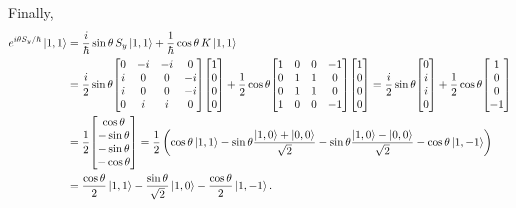 \begin{solution}
	Finally,
	\begin{align*}
		\eitsyh \kqq &= \frac{i}{\hbar} \sint \, \Sy \kqq + \frac{1}{\hbar} \cost \, K \kqq \\
		&= \frac{i}{2} \sint \mqty[ 0 & -i & -i & 0 \\ i & 0 & 0 & -i \\ i & 0 & 0 & -i \\ 0 & i & i & 0 ] \mqty[ 1 \\ 0 \\ 0 \\ 0 ] + \frac{1}{2} \cost \mqty[ 1 & 0 & 0 & -1 \\ 0 & 1 & 1 & 0 \\ 0 & 1 & 1 & 0 \\ 1 & 0 & 0 & -1 ] \mqty[ 1 \\ 0 \\ 0 \\ 0 ] = \frac{i}{2} \sint \mqty[ 0 \\ i \\ i \\ 0 ] + \frac{1}{2} \cost \mqty[ 1 \\ 0 \\ 0 \\ -1 ] \\
		&= \frac{1}{2} \mqty[ \cost \\ -\sint \\ -\sint \\ -\cost ]
		= \frac{1}{2} \left( \cost \kqq - \sint \frac{\kqo + \koo}{\sqrt{2}} - \sint \frac{\kqo - \koo}{\sqrt{2}} - \cost \kqnq \right) \\
		&= \frac{\cost}{2} \kqq - \frac{\sint}{\sqrt{2}} \kqo - \frac{\cost}{2} \kqnq.
	\end{align*}
\vfix
\end{solution}